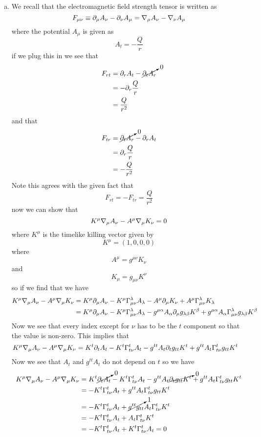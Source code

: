 \documentclass[11pt]{article}
\numberwithin{equation}{section}
\begin{document}
\begin{enumerate}[(a)]
\item
We recall that the electromagnetic field strength tensor is written as
$$F_{\mu\nu}\equiv\partial_{\mu}A_{\nu} - \partial_{\nu}A_{\mu} = \bold\nabla_{\mu}A_{\nu} - \bold\nabla_{\nu}A_{\mu}$$
where the potential $A_{\mu}$ is given as
$$A_{t} = -\frac{Q}{r}$$
if we plug this in we see that
\begin{align*}
F_{rt} &= \partial_{r}A_{t} - \cancelto{0}{\partial_{t}A_{r}}\\
&= -\partial_{r}\frac{Q}{r} \\
&= \frac{Q}{r^2}
\end{align*}
and that
\begin{align*}
F_{tr} &= \cancelto{0}{\partial_{t}A_{r}} - \partial_{r}A_{t}\\
&= \partial_{r}\frac{Q}{r}\\
&= -\frac{Q}{r^2}
\end{align*}
Note this agrees with the given fact that
$$F_{rt} = -F_{tr} = \frac{Q}{r^2}$$
now we can show that 
$$K^{\mu}\bold\nabla_{\mu}A_{\nu} - A^{\mu}\bold\nabla_{\mu}K_{\nu} = 0$$
where $K^{\mu}$ is the timelike killing vector given by
$$K^{\mu} = (1,0,0,0)$$
where
$$A^{\mu} = g^{\mu\nu}K_{\nu}$$
and
$$K_{\mu} = g_{\mu\nu}K^{\nu}$$
so if we find that we have
\begin{align*}
K^{\mu}\bold\nabla_{\mu}A_{\nu} - A^{\mu}\bold\nabla_{\mu}K_{\nu} &= K^{\mu}\partial_{\mu}A_{\nu} - K^{\mu}\Gamma^{\lambda}_{\mu\nu}A_{\lambda} - A^{\mu}\partial_{\mu}K_{\nu} + A^{\mu}\Gamma^{\lambda}_{\mu\nu}K_{\lambda}\\
&= K^{\mu}\partial_{\mu}A_{\nu} - K^{\mu}\Gamma^{\lambda}_{\mu\nu}A_{\lambda} - g^{\mu\alpha}A_{\alpha}\partial_{\mu}g_{\lambda\beta}K^{\beta} + g^{\mu\alpha}A_{\alpha}\Gamma^{\lambda}_{\mu\nu}g_{\lambda\beta}K^{\beta}
\end{align*}
Now we see that every index except for $\nu$ has to be the $t$ component so that the value is non-zero. This implies that
\begin{align*}
K^{\mu}\bold\nabla_{\mu}A_{\nu} - A^{\mu}\bold\nabla_{\mu}K_{\nu} &= K^{t}\partial_{t}A_{t} - K^{t}\Gamma^{t}_{t\nu}A_{t} - g^{tt}A_{t}\partial_{t}g_{tt}K^{t} + g^{tt}A_{t}\Gamma^{t}_{t\nu}g_{tt}K^{t}
\end{align*}
Now we see that $A_t$ and $g^{tt}A_t$ do not depend on $t$ so we have
\begin{align*}
K^{\mu}\bold\nabla_{\mu}A_{\nu} - A^{\mu}\bold\nabla_{\mu}K_{\nu} &= K^{t}\cancelto{0}{\partial_{t}A_{t}} - K^{t}\Gamma^{t}_{t\nu}A_{t} - g^{tt}A_{t}\cancelto{0}{\partial_{t}g_{tt}K^{t}} + g^{tt}A_{t}\Gamma^{t}_{t\nu}g_{tt}K^{t}\\
&= - K^{t}\Gamma^{t}_{t\nu}A_{t} + g^{tt}A_{t}\Gamma^{t}_{t\nu}g_{tt}K^{t}\\
&= - K^{t}\Gamma^{t}_{t\nu}A_{t} + \cancelto{1}{g^{tt}g_{tt}}A_{t}\Gamma^{t}_{t\nu}K^{t}\\
&= - K^{t}\Gamma^{t}_{t\nu}A_{t} + A_{t}\Gamma^{t}_{t\nu}K^{t}\\
&= - K^{t}\Gamma^{t}_{t\nu}A_{t} + K^{t}\Gamma^{t}_{t\nu}A_{t} = 0
\end{align*}


\end{enumerate}
\end{document}
